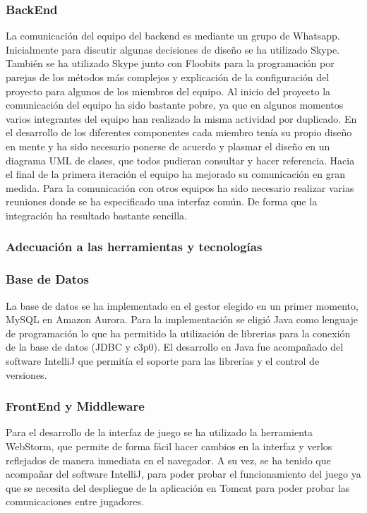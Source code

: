 \subsubsection*{BackEnd}
La comunicación del equipo del backend es mediante un grupo de Whatsapp. Inicialmente para discutir algunas decisiones de diseño se ha utilizado Skype. También se ha utilizado Skype junto con Floobits para la programación por parejas de los métodos más complejos y explicación de la configuración del proyecto para algunos de los miembros del equipo.
Al inicio del proyecto la comunicación del equipo ha sido bastante pobre, ya que en algunos momentos varios integrantes del equipo han realizado la misma actividad por duplicado. En el desarrollo de los diferentes componentes cada miembro tenía su propio diseño en mente y ha sido necesario ponerse de acuerdo y plasmar el diseño en un diagrama UML de clases, que todos pudieran consultar y hacer referencia. Hacia el final de la primera iteración el equipo ha mejorado su comunicación en gran medida.
Para la comunicación con otros equipos ha sido necesario realizar varias reuniones donde se ha especificado una interfaz común. De forma que la integración ha resultado bastante sencilla.
\subsubsection{Adecuación a las herramientas y tecnologías}
\subsubsection*{Base de Datos}
La base de datos se ha implementado en el gestor elegido en un primer momento, MySQL en Amazon Aurora. Para la implementación se eligió Java como lenguaje de programación lo que ha permitido la utilización de librerias para la conexión de la base de datos (JDBC y c3p0). El desarrollo en Java fue acompañado del software IntelliJ que permitía el soporte para las librerías y el control de versiones. 
\subsubsection*{FrontEnd y Middleware}
Para el desarrollo de la interfaz de juego se ha utilizado la herramienta WebStorm, que permite de forma fácil hacer cambios en la interfaz y verlos reflejados de manera inmediata en el navegador. A su vez, se ha tenido que acompañar del software IntelliJ, para poder probar el funcionamiento del juego ya que se necesita del despliegue de la aplicación en Tomcat para poder probar las comunicaciones entre jugadores.

